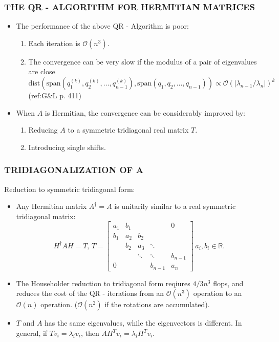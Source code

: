 \documentclass[a4paper,8pt]{beamer} %
\newcommand{\smatrix}[1]{\left[\begin{matrix} #1 \end{matrix}\right]}
\begin{document}
\begin{frame}[label=framelb1]  %
\frametitle{THE QR - ALGORITHM FOR HERMITIAN MATRICES }
\begin{itemize}
\item The performance of the above QR - Algorithm is poor:
	\begin{enumerate}
		\item Each iteration is $\mathcal O(n^3)$.
		\item The convergence can be very slow if the modulus of a pair of eigenvalues are close
		\[ \text{dist}(\text{span}(q_1^{(k)},q_2^{(k)},\dots,q_{n-1}^{(k)})
		,\text{span}(q_1,q_2,\dots,q_{n-1})) \propto \mathcal O(|\lambda_{n-1}/\lambda_n|)^k \]
		(ref:G\&L p. 411)	
		\hyperlink{dist span}{\beamergotobutton{(*)}}
	\end{enumerate}
\item When $A$ is Hermitian, the convergence can be considerably improved by:
	\begin{enumerate}
		\item Reducing $A$ to a symmetric tridiagonal real matrix $T$.
		\item Introducing single shifts. 
	\end{enumerate}
\end{itemize}
\end{frame} %

\begin{frame}[label=tridiagonalizationofa]  %
\frametitle{TRIDIAGONALIZATION OF A}
Reduction to symmetric tridiagonal form:
\begin{itemize}
	\item Any Hermitian matrix $A^\dagger = A$ is unitarily similar to a real symmetric tridiagonal matrix:
\begin{equation}
H^\dagger AH = T,\, 
T=
	\smatrix{
		a_1 & b_1 & & & 0\\
		b_1 & a_2 & b_2 & & \\
		& b_2 & a_3 & \ddots & \\
		& & \ddots	& \ddots & b_{n-1} \\
		0& & & b_{n-1}& a_n 
	}
	\, a_i, b_i \in \mathbb R.
\end{equation}
	\item
		The Householder reduction to tridiagonal form reqiures $ 4/3 n^3$ flops, and reduces the cost of the 
		QR - iterations from an $\mathcal O(n^3)$ operation to an $\mathcal O(n)$ operation. 
		($\mathcal O(n^2)$ if the rotations are accumulated).
	\item  
		$T$ and $A$ has the same eigenvalues, while the eigenvectors 
		is different. In general, if $Tv_i = \lambda_iv_i$, then $A H^T v_i = \lambda_i H^Tv_i$.
\end{itemize}	
\begin{footnotesize}
	\hyperlink{householders explained}{\beamergotobutton{(*)}} 
\end{footnotesize}
\end{frame} %
\end{document}
